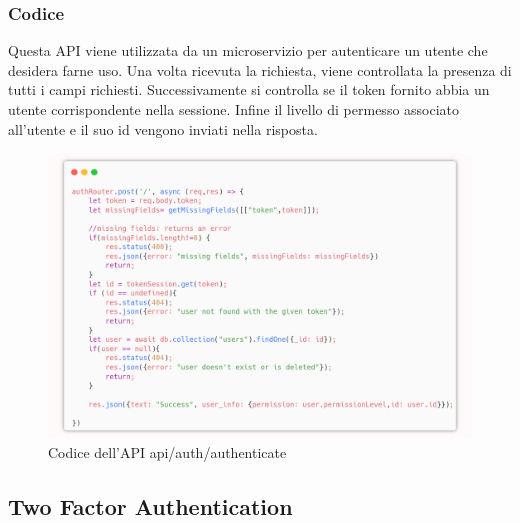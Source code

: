 \documentclass{report}
\begin{document}
\subsubsection*{Codice}
Questa API viene utilizzata da un microservizio per autenticare un utente che desidera farne uso.
Una volta ricevuta la richiesta, viene controllata la presenza di tutti i campi richiesti.
Successivamente si controlla se il token fornito abbia un utente corrispondente nella sessione.
Infine il livello di permesso associato all'utente e il suo id vengono inviati nella risposta.
\begin{figure}[H]
	\centering\includegraphics[width=1\textwidth]{images/microservizio-autenticazione/authenticate-carbon.png}
	Codice dell'API api/auth/authenticate
\end{figure}

\subsection{Two Factor Authentication}
\end{document}
